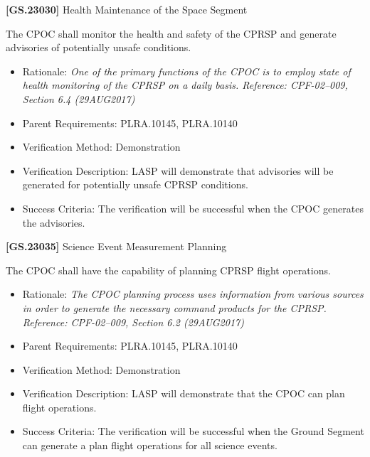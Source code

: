 \textbf{[GS.23030]} Health Maintenance of the Space Segment

The \gls{CPOC} shall monitor the health and safety of the \gls{CPRSP} and generate advisories of potentially unsafe conditions.

\begin{itemize}
\item{} Rationale: \emph{One of the primary functions of the CPOC is to employ state of health monitoring of the CPRSP on a daily basis. Reference: CPF-02--009, Section 6.4 (29AUG2017)}

\item{} Parent Requirements: PLRA.10145, PLRA.10140

\item{} Verification Method: Demonstration

\item{} Verification Description: \gls{LASP} will demonstrate that advisories will be generated for potentially unsafe \gls{CPRSP} conditions.

\item{} Success Criteria: The verification will be successful when the \gls{CPOC} generates the advisories.

\end{itemize}

\textbf{[GS.23035]} Science Event Measurement Planning

The \gls{CPOC} shall have the capability of planning \gls{CPRSP} flight operations.

\begin{itemize}
\item{} Rationale: \emph{The CPOC planning process uses information from various sources in order to generate the necessary command products for the CPRSP. Reference: CPF-02--009, Section 6.2 (29AUG2017)}

\item{} Parent Requirements: PLRA.10145, PLRA.10140

\item{} Verification Method: Demonstration

\item{} Verification Description: \gls{LASP} will demonstrate that the \gls{CPOC} can plan flight operations.

\item{} Success Criteria: The verification will be successful when the Ground Segment can generate a plan flight operations for all science events.

\end{itemize}

